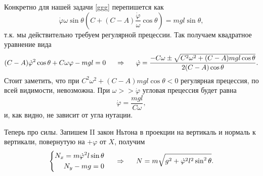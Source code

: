  Конкретно для нашей задачи \eqref{ggg} перепишется как
 \begin{equation*}
     \dot{\varphi} \omega \sin \theta 
     \left(
        C + (C-A) \frac{\dot{\varphi}}{\omega} \cos \theta
     \right) = mgl \sin \theta,
 \end{equation*}
 т.к. мы действительно требуем регулярной прецессии. Так получаем квадратное уравнение вида
 \begin{equation}
     (C-A) \dot{\varphi}^2 \cos \theta + C \omega \varphi - mgl = 0
     \hspace{0.5cm} \Rightarrow \hspace{0.5cm} 
     \dot{\varphi} = 
     \frac{
        - C \omega \pm \sqrt{
            C^2 \omega^2 + (C-A) mgl \cos \theta
        }
     }{
        2(C-A) \cos \theta
     }  .
 \end{equation}
Стоит заметить, что при $C^2 \omega^2 + (C-A) mgl \cos \theta < 0$ регулярная прецессия, по всей видимости, невозможна. При $\omega >> \dot{\varphi}$ угловая прецессия будет равна
\begin{equation}
    \dot{\varphi} = \frac{mgl}{C\omega},
\end{equation}
и, как видно, не зависит от угла нутации. 

Теперь про силы. Запишем II закон Ньтона в проекции на вертикаль и нормаль к вертикали, повернутую на $+\varphi$ от $X$, получим
\begin{equation}
    \left\{\begin{aligned}
        N_x = m \dot{\varphi}^2 l \sin \theta \\
        N_y - mg = 0        
    \end{aligned}\right.
    \hspace{0.5cm} \Rightarrow \hspace{0.5cm} 
    N = m\sqrt{g^2 + \dot{\varphi}^2 l^2 \sin^2 \theta}.
\end{equation}